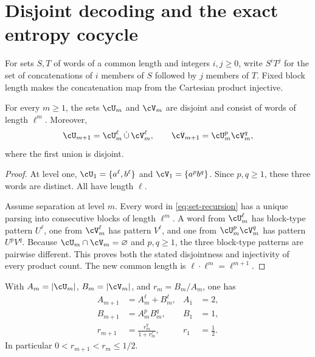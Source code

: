 \section{Disjoint decoding and the exact entropy cocycle}
\label{sec:exact}

For sets $S,T$ of words of a common length and integers $i,j\ge0$, write
$S^iT^j$ for the set of concatenations of $i$ members of $S$ followed by
$j$ members of $T$.  Fixed block length makes the concatenation map from the
Cartesian product injective.

\begin{lemma}
\label{lem:separation}
For every $m\ge1$, the sets $\cU_m$ and $\cV_m$ are disjoint and consist of
words of length $\ell^m$.  Moreover,
\begin{equation}
 \cU_{m+1}=\cU_m^\ell\,\dot\cup\,\cV_m^\ell,
 \qquad
 \cV_{m+1}=\cU_m^p\cV_m^q,
 \label{eq:set-recursion}
\end{equation}
where the first union is disjoint.
\end{lemma}

\begin{proof}
At level one, $\cU_1=\{a^\ell,b^\ell\}$ and
$\cV_1=\{a^pb^q\}$.  Since $p,q\ge1$, these three words are distinct.
All have length $\ell$.

Assume separation at level $m$.  Every word in \cref{eq:set-recursion} has a
unique parsing into consecutive blocks of length $\ell^m$.  A word from
$\cU_m^\ell$ has block-type pattern $U^\ell$, one from $\cV_m^\ell$ has
pattern $V^\ell$, and one from $\cU_m^p\cV_m^q$ has pattern $U^pV^q$.
Because $\cU_m\cap\cV_m=\varnothing$ and $p,q\ge1$, the three block-type
patterns are pairwise different.  This proves both the stated disjointness
and injectivity of every product count.  The new common length is
$\ell\cdot\ell^m=\ell^{m+1}$.
\end{proof}

\begin{proposition}
\label{prop:recurrence}
With $A_m=|\cU_m|$, $B_m=|\cV_m|$, and $r_m=B_m/A_m$, one has
\begin{align}
 A_{m+1}&=A_m^\ell+B_m^\ell,& A_1&=2,\label{eq:A-rec}\\
 B_{m+1}&=A_m^pB_m^q,& B_1&=1,\label{eq:B-rec}\\
 r_{m+1}&=\frac{r_m^q}{1+r_m^\ell},& r_1&=\frac12.\label{eq:r-rec}
\end{align}
In particular $0<r_{m+1}<r_m\le1/2$.
\end{proposition}

